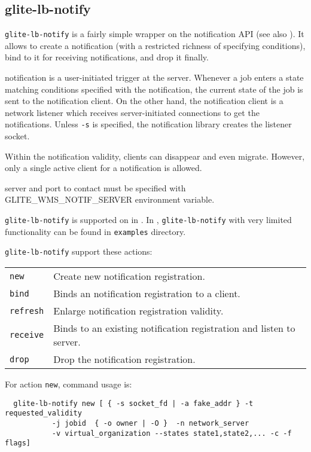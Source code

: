 \subsection{glite-lb-notify}
\label{s:lb-notify}

\verb'glite-lb-notify' is a fairly simple wrapper on the \LB notification API
(see also \cite{lbdg}).
It allows to create a notification (with a restricted richness of specifying 
conditions), bind to it for receiving notifications, and drop it finally.

\LB notification is a user-initiated trigger at the server.
Whenever a job enters a state matching conditions specified with the notification,
the current state of the job is sent to the notification client.
On the other hand, the notification client is a network listener
which receives server-initiated connections to get the notifications.
Unless \verb'-s' is specified, the notification library creates the listener
socket.

Within the notification validity, clients can disappear and even migrate.
However, only a single active client for a notification is allowed.

\LB server and port to contact must be specified with GLITE\_WMS\_NOTIF\_SERVER 
environment variable.

\verb'glite-lb-notify' is supported on in \LBnew. In \LBold, \verb'glite-lb-notify' 
with very limited functionality can be found in \verb'examples' directory.

\verb'glite-lb-notify' support these actions:

\begin{tabularx}{\textwidth}{lX}
\texttt{new} & Create new notification registration.\\
\texttt{bind} &  Binds an notification registration to a client.\\
\texttt{refresh} &  Enlarge notification registration validity.\\
\texttt{receive}  & Binds to an existing notification registration and listen to
server.\\
\texttt{drop}     & Drop the notification registration.\\
\end{tabularx}

For action \verb'new', command usage is:

\begin{verbatim}
  glite-lb-notify new [ { -s socket_fd | -a fake_addr } -t requested_validity
           -j jobid  { -o owner | -O }  -n network_server 
           -v virtual_organization --states state1,state2,... -c -f flags]
\end{verbatim}

